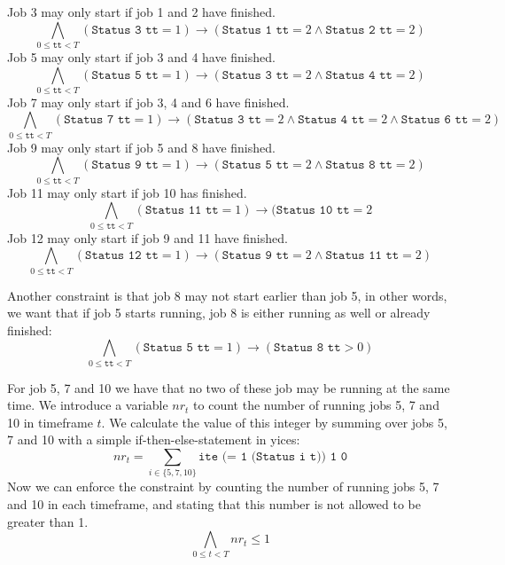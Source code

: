 \documentclass[12pt]{article}
\begin{document}
Job 3 may only start if job 1 and 2 have finished.
\[ \bigwedge_{0 \le \texttt{tt} < T} (\texttt{Status 3 tt} = 1) \rightarrow (\texttt{Status 1 tt} = 2 \wedge \texttt{Status 2 tt} = 2) \]
Job 5 may only start if job 3 and 4 have finished.
\[ \bigwedge_{0 \le \texttt{tt} < T} (\texttt{Status 5 tt} = 1) \rightarrow (\texttt{Status 3 tt} = 2 \wedge \texttt{Status 4 tt} = 2) \]
Job 7 may only start if job 3, 4 and 6 have finished.
\[ \bigwedge_{0 \le \texttt{tt} < T} (\texttt{Status 7 tt} = 1) \rightarrow (\texttt{Status 3 tt} = 2 \wedge \texttt{Status 4 tt} = 2 \wedge \texttt{Status 6 tt} = 2) \]
Job 9 may only start if job 5 and 8 have finished.
\[ \bigwedge_{0 \le \texttt{tt} < T} (\texttt{Status 9 tt} = 1) \rightarrow (\texttt{Status 5 tt} = 2 \wedge \texttt{Status 8 tt} = 2) \]
Job 11 may only start if job 10 has finished.
\[ \bigwedge_{0 \le \texttt{tt} < T} (\texttt{Status 11 tt} = 1) \rightarrow (\texttt{Status 10 tt} = 2\]
Job 12 may only start if job 9 and 11 have finished.
\[ \bigwedge_{0 \le \texttt{tt} < T} (\texttt{Status 12 tt} = 1) \rightarrow (\texttt{Status 9 tt} = 2 \wedge \texttt{Status 11 tt} = 2) \]

Another constraint is that job 8 may not start earlier than job 5, in other words, we want that if job 5 starts running, job 8 is either running as well or already finished:
\[ \bigwedge_{0 \le \texttt{tt} < T} (\texttt{Status 5 tt} = 1) \rightarrow (\texttt{Status 8 tt} > 0) \]

For job 5, 7 and 10 we have that no two of these job may be running at the same time. 
We introduce a variable $nr_t$ to count the number of running jobs 5, 7 and 10 in timeframe $t$.
We calculate the value of this integer by summing over jobs 5, 7 and 10 with a simple if-then-else-statement in yices: 
\[ nr_t = \sum_{i \in \{5,7,10\}} \texttt{ite (= 1 (Status i t)) 1 0} \]
Now we can enforce the constraint by counting the number of running jobs 5, 7 and 10 in each timeframe, 
and stating that this number is not allowed to be greater than 1. 
\[ \bigwedge_{0 \le t < T} nr_t \le 1\]
\end{document}
